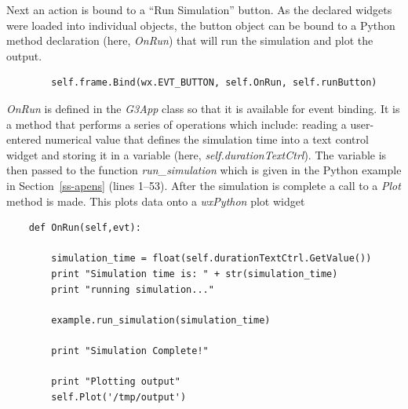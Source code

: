 \documentclass[12pt]{article}
\begin{document}
Next an action is bound to a ``Run Simulation'' button. As the declared widgets were loaded into individual objects, the button object can be bound to a Python method declaration (here,  {\it OnRun})
that will run the simulation and plot the output.

{\footnotesize
   \linenumbers
 \begin{verbatim}
        self.frame.Bind(wx.EVT_BUTTON, self.OnRun, self.runButton)
 \end{verbatim} 
}



% 


{\it OnRun} is defined in the {\it G3App} class so that it is available for event binding. It is a method that performs a series of operations which include: reading a user-entered numerical value that defines the simulation time into a text control widget and storing it in a variable (here, {\it self.durationTextCtrl}). The variable is then passed to the function {\it run\_simulation} which is given in the Python example in Section~\ref{ss-apens} (lines 1--53). After the simulation is complete a call to a {\it Plot} method is made. This plots data onto a {\it wxPython} plot widget

{\footnotesize
  \linenumbers
\begin{verbatim}
    def OnRun(self,evt):

        simulation_time = float(self.durationTextCtrl.GetValue())
        print "Simulation time is: " + str(simulation_time)
        print "running simulation..."

        example.run_simulation(simulation_time)

        print "Simulation Complete!"

        print "Plotting output"
        self.Plot('/tmp/output')
\end{verbatim}
}
 
\end{document}
